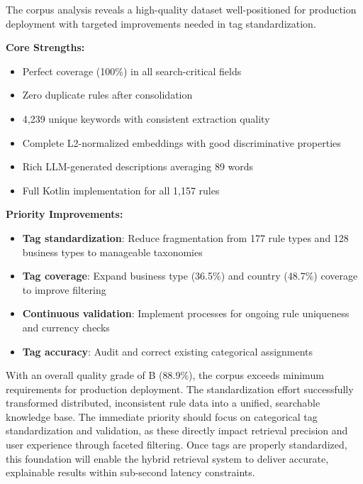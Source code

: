 The corpus analysis reveals a high-quality dataset well-positioned for production deployment with targeted improvements needed in tag standardization.

\textbf{Core Strengths:}
\begin{itemize}[leftmargin=*,itemsep=2pt,topsep=2pt]
 \item Perfect coverage (100\%) in all search-critical fields
 \item Zero duplicate rules after consolidation
 \item 4,239 unique keywords with consistent extraction quality
 \item Complete L2-normalized embeddings with good discriminative properties
 \item Rich LLM-generated descriptions averaging 89 words
 \item Full Kotlin implementation for all 1,157 rules
\end{itemize}

\textbf{Priority Improvements:}
\begin{itemize}[leftmargin=*,itemsep=2pt,topsep=2pt]
 \item \textbf{Tag standardization}: Reduce fragmentation from 177 rule types and 128 business types to manageable taxonomies
 \item \textbf{Tag coverage}: Expand business type (36.5\%) and country (48.7\%) coverage to improve filtering
 \item \textbf{Continuous validation}: Implement processes for ongoing rule uniqueness and currency checks
 \item \textbf{Tag accuracy}: Audit and correct existing categorical assignments
\end{itemize}

With an overall quality grade of B (88.9\%), the corpus exceeds minimum requirements for production deployment. The standardization effort successfully transformed distributed, inconsistent rule data into a unified, searchable knowledge base. The immediate priority should focus on categorical tag standardization and validation, as these directly impact retrieval precision and user experience through faceted filtering. Once tags are properly standardized, this foundation will enable the hybrid retrieval system to deliver accurate, explainable results within sub-second latency constraints.
